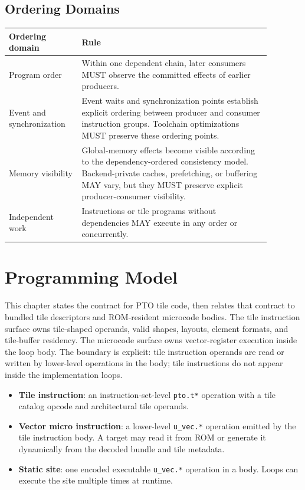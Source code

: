 \subsection{Ordering Domains}
\begin{longtable}{@{}L{0.24\linewidth}L{0.64\linewidth}@{}}
\toprule
Ordering domain & Rule \\
\midrule
Program order & Within one dependent chain, later consumers MUST observe the committed effects of earlier producers. \\
Event and synchronization & Event waits and synchronization points establish explicit ordering between producer and consumer instruction groups. Toolchain optimizations MUST preserve these ordering points. \\
Memory visibility & Global-memory effects become visible according to the dependency-ordered consistency model. Backend-private caches, prefetching, or buffering MAY vary, but they MUST preserve explicit producer-consumer visibility. \\
Independent work & Instructions or tile programs without dependencies MAY execute in any order or concurrently. \\
\bottomrule
\end{longtable}

\section{Programming Model}
This chapter states the contract for PTO tile code, then relates that contract to bundled tile descriptors and ROM-resident microcode bodies.
The tile instruction surface owns tile-shaped operands, valid shapes, layouts, element formats, and tile-buffer residency. The microcode surface owns vector-register execution inside the loop body. The boundary is explicit: tile instruction operands are read or written by lower-level operations in the body; tile instructions do not appear inside the implementation loops.
\begin{itemize}
\item \textbf{Tile instruction}: an instruction-set-level \texttt{pto.t*} operation with a tile catalog opcode and architectural tile operands.
\item \textbf{Vector micro instruction}: a lower-level \texttt{u\_vec.*} operation emitted by the tile instruction body. A target may read it from ROM or generate it dynamically from the decoded bundle and tile metadata.
\item \textbf{Static site}: one encoded executable \texttt{u\_vec.*} operation in a body. Loops can execute the site multiple times at runtime.
\end{itemize}

